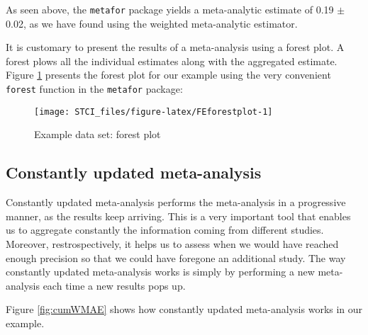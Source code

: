 \documentclass[]{book}
\newenvironment{Shaded}{\begin{snugshade}}{\end{snugshade}}
\newcommand{\KeywordTok}[1]{\textcolor[rgb]{0.13,0.29,0.53}{\textbf{#1}}}
\newcommand{\DataTypeTok}[1]{\textcolor[rgb]{0.13,0.29,0.53}{#1}}
\newcommand{\StringTok}[1]{\textcolor[rgb]{0.31,0.60,0.02}{#1}}
\newcommand{\OperatorTok}[1]{\textcolor[rgb]{0.81,0.36,0.00}{\textbf{#1}}}
\newcommand{\NormalTok}[1]{#1}
\theoremstyle{definition}
\theoremstyle{definition}
\theoremstyle{definition}
\theoremstyle{remark}
\let\BeginKnitrBlock\begin \let\EndKnitrBlock\end
\begin{document}
As seen above, the \texttt{metafor} package yields a meta-analytic
estimate of 0.19 \(\pm\) 0.02, as we have found using the weighted
meta-analytic estimator.

It is customary to present the results of a meta-analysis using a forest
plot. A forest plows all the individual estimates along with the
aggregated estimate. Figure \ref{fig:FEforestplot} presents the forest
plot for our example using the very convenient \texttt{forest} function
in the \texttt{metafor} package:

\begin{Shaded}
\end{Shaded}

\begin{figure}[htbp]

{\centering \texttt{[image: STCI\_files/figure-latex/FEforestplot-1]} 

}

\caption{Example data set: forest plot}\label{fig:FEforestplot}
\end{figure}

\subsection{Constantly updated
meta-analysis}\label{constantly-updated-meta-analysis}

Constantly updated meta-analysis performs the meta-analysis in a
progressive manner, as the results keep arriving. This is a very
important tool that enables us to aggregate constantly the information
coming from different studies. Moreover, restrospectively, it helps us
to assess when we would have reached enough precision so that we could
have foregone an additional study. The way constantly updated
meta-analysis works is simply by performing a new meta-analysis each
time a new results pops up.

\BeginKnitrBlock{example}
\protect\hypertarget{exm:unnamed-chunk-142}{}{\label{exm:unnamed-chunk-142}
}Figure \ref{fig:cumWMAE} shows how constantly updated meta-analysis
works in our example.
\EndKnitrBlock{example}
\end{document}
